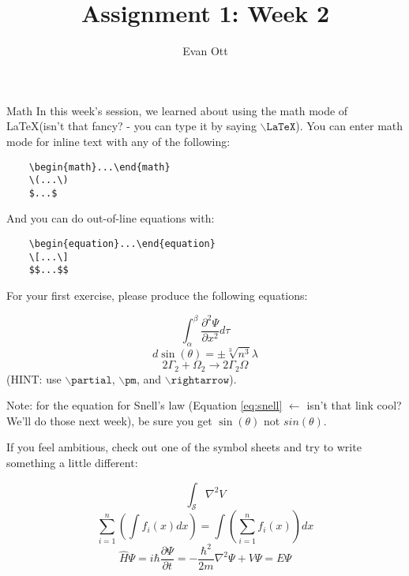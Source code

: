\documentclass{article}
\title{Assignment 1: Week 2}
\author{Evan Ott}
\begin{document}
\maketitle

\begin{section}{Math}
	In this week's session, we learned about using the math mode of \LaTeX (isn't that fancy? - you can type it by saying $\backslash\texttt{LaTeX}$). You can enter math mode for inline text with any of the following:
\begin{verbatim}
	\begin{math}...\end{math}
	\(...\)
	$...$
\end{verbatim}
And you can do out-of-line equations with:
\begin{verbatim}
	\begin{equation}...\end{equation}
	\[...\]
	$$...$$
\end{verbatim}

For your first exercise, please produce the following equations:

\Large
\begin{equation}
	\int_\alpha^\beta\frac{\partial^2\Psi}{\partial{x^2}}d\tau
\end{equation}
\begin{equation}
	\label{eq:snell}
	d\sin(\theta)=\pm{\sqrt[3]{n^3}}\lambda
\end{equation}
\begin{equation}
	2\Gamma_2+\Omega_2\rightarrow 2\Gamma_2\Omega
\end{equation}
\normalsize(HINT: use $\backslash\texttt{partial}$, $\backslash\texttt{pm}$, and $\backslash\texttt{rightarrow}$).

Note: for the equation for Snell's law (Equation \ref{eq:snell} $\leftarrow$ isn't that link cool? We'll do those next week), be sure you get $\sin(\theta)$ not $sin(\theta)$.

If you feel ambitious, check out one of the symbol sheets and try to write something a little different:

\Large
\begin{equation}
	\int_{\mathcal{S}}\nabla^2V
\end{equation}
\begin{equation}
	\sum_{i=1}^{n}(\int{f_i(x)dx})=\int(\sum_{i=1}^{n}f_i(x))dx
\end{equation}
\begin{equation}
	\widehat{H}\Psi=i\hbar\frac{\partial\Psi}{\partial{t}}=-\frac{\hbar^2}{2m}\nabla^2\Psi+V\Psi=E\Psi
\end{equation}
\end{section}
\end{document}
